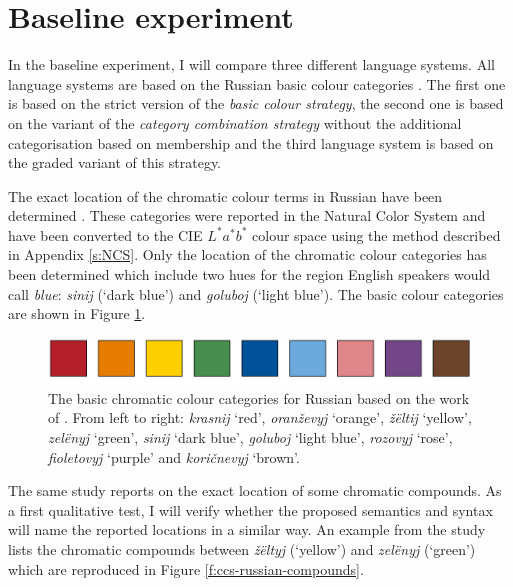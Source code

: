 \section{Baseline experiment}

In the baseline experiment, I will compare three different language
systems. All language systems are based on the Russian basic colour
categories \citep{safuanova07russian}. The first one is based on the
strict version of the \emph{basic colour strategy}, the second one is
based on the variant of the \emph{category combination strategy}
without the additional categorisation based on membership and the
third language system is based on the graded variant of this strategy.

The exact location of the chromatic colour terms in Russian have been
determined \citep{safuanova07russian}. These categories were reported
in the Natural Color System and have been converted to the CIE
$L^*a^*b^*$ colour space using the method described in Appendix
\ref{s:NCS}. Only the location of the chromatic colour categories has
been determined which include two hues for the region English speakers
would call \textit{blue}: \textit{sinij} (`dark blue') and \textit{goluboj} (`light
blue'). The basic colour categories are shown in Figure
\ref{f:ccs-russian-basic}.

\begin{figure}[htpb]
  \centering
  \includegraphics[width=.9\textwidth]{./category-combination/figures/russian-basic-categories.pdf}
  \caption[The basic chromatic colour categories for Russian]{The
    basic chromatic colour categories for Russian based on the work of
    \citeauthor{safuanova07russian}. From left to right: \textit{krasnij}
    `red', \textit{oran\v zevyj} `orange', \textit{\v z\"eltij} `yellow', \textit{zel\"enyj}
    `green', \textit{sinij} `dark blue', \textit{goluboj} `light blue',
    \textit{rozovyj} `rose', \textit{fioletovyj} `purple' and \textit{kori\v cnevyj}
    `brown'.}
  \label{f:ccs-russian-basic}
\end{figure}

The same study reports on the exact location of some chromatic
compounds. As a first qualitative test, I will verify whether the
proposed semantics and syntax will name the reported locations in a
similar way. An example from the study lists the chromatic compounds
between \textit{\v z\"eltyj} (`yellow') and \textit{zel\"enyj} (`green') which are
reproduced in Figure \ref{f:ccs-russian-compounds}.

